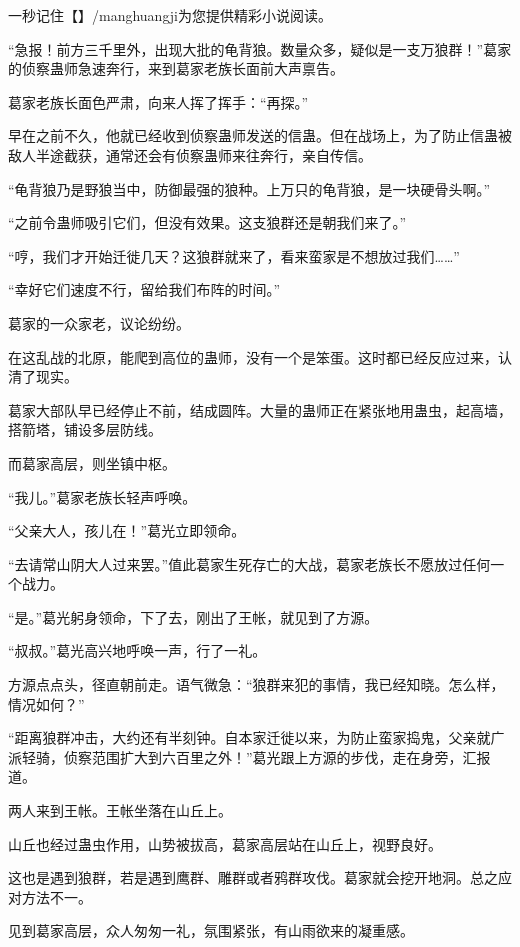 
\begin{this_body}

一秒记住【】/manghuangji为您提供精彩小说阅读。

“急报！前方三千里外，出现大批的龟背狼。数量众多，疑似是一支万狼群！”葛家的侦察蛊师急速奔行，来到葛家老族长面前大声禀告。

葛家老族长面色严肃，向来人挥了挥手：“再探。”

早在之前不久，他就已经收到侦察蛊师发送的信蛊。但在战场上，为了防止信蛊被敌人半途截获，通常还会有侦察蛊师来往奔行，亲自传信。

“龟背狼乃是野狼当中，防御最强的狼种。上万只的龟背狼，是一块硬骨头啊。”

“之前令蛊师吸引它们，但没有效果。这支狼群还是朝我们来了。”

“哼，我们才开始迁徙几天？这狼群就来了，看来蛮家是不想放过我们……”

“幸好它们速度不行，留给我们布阵的时间。”

葛家的一众家老，议论纷纷。

在这乱战的北原，能爬到高位的蛊师，没有一个是笨蛋。这时都已经反应过来，认清了现实。

葛家大部队早已经停止不前，结成圆阵。大量的蛊师正在紧张地用蛊虫，起高墙，搭箭塔，铺设多层防线。

而葛家高层，则坐镇中枢。

“我儿。”葛家老族长轻声呼唤。

“父亲大人，孩儿在！”葛光立即领命。

“去请常山阴大人过来罢。”值此葛家生死存亡的大战，葛家老族长不愿放过任何一个战力。

“是。”葛光躬身领命，下了去，刚出了王帐，就见到了方源。

“叔叔。”葛光高兴地呼唤一声，行了一礼。

方源点点头，径直朝前走。语气微急：“狼群来犯的事情，我已经知晓。怎么样，情况如何？”

“距离狼群冲击，大约还有半刻钟。自本家迁徙以来，为防止蛮家捣鬼，父亲就广派轻骑，侦察范围扩大到六百里之外！”葛光跟上方源的步伐，走在身旁，汇报道。

两人来到王帐。王帐坐落在山丘上。

山丘也经过蛊虫作用，山势被拔高，葛家高层站在山丘上，视野良好。

这也是遇到狼群，若是遇到鹰群、雕群或者鸦群攻伐。葛家就会挖开地洞。总之应对方法不一。

见到葛家高层，众人匆匆一礼，氛围紧张，有山雨欲来的凝重感。


\end{this_body}

